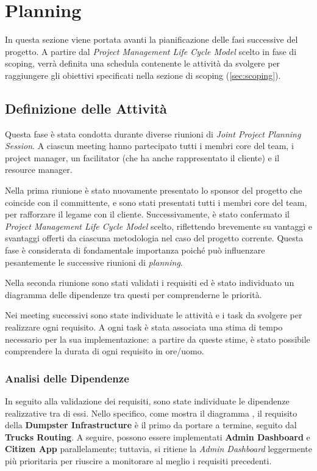 \section{Planning}
\label{sec:planning}

In questa sezione viene portata avanti la pianificazione delle fasi successive del progetto. A partire dal \textit{Project Management Life Cycle Model} scelto in fase di scoping, verrà definita una schedula contenente le attività da svolgere per raggiungere gli obiettivi specificati nella sezione di scoping (\ref{sec:scoping}).

\subsection{Definizione delle Attività}
Questa fase è stata condotta durante diverse riunioni di \textit{Joint Project Planning Session}. A ciascun meeting hanno partecipato tutti i membri core del team, i project manager, un facilitator (che ha anche rappresentato il cliente) e il resource manager.

Nella prima riunione è stato nuovamente presentato lo sponsor del progetto che coincide con il committente, e sono stati presentati tutti i membri core del team, per rafforzare il legame con il cliente. Successivamente, è stato confermato il \textit{Project Management Life Cycle Model} scelto, riflettendo brevemente su vantaggi e svantaggi offerti da ciascuna metodologia nel caso del progetto corrente. Questa fase è considerata di fondamentale importanza poiché può influenzare pesantemente le successive riunioni di \textit{planning}.

Nella seconda riunione sono stati validati i requisiti ed è stato individuato un diagramma delle dipendenze tra questi per comprenderne le priorità.

Nei meeting successivi sono state individuate le attività e i task da svolgere per realizzare ogni requisito. A ogni task è stata associata una stima di tempo necessario per la sua implementazione: a partire da queste stime, è stato possibile comprendere la durata di ogni requisito in ore/uomo.

\subsubsection{Analisi delle Dipendenze}
In seguito alla validazione dei requisiti, sono state individuate le dipendenze realizzative tra di essi. Nello specifico, come mostra il diagramma , il requisito della \textbf{Dumpster Infrastructure} è il primo da portare a termine, seguito dal \textbf{Trucks Routing}. A seguire, possono essere implementati \textbf{Admin Dashboard} e \textbf{Citizen App} parallelamente; tuttavia, si ritiene la \textit{Admin Dashboard} leggermente più prioritaria per riuscire a monitorare al meglio i requisiti precedenti.

